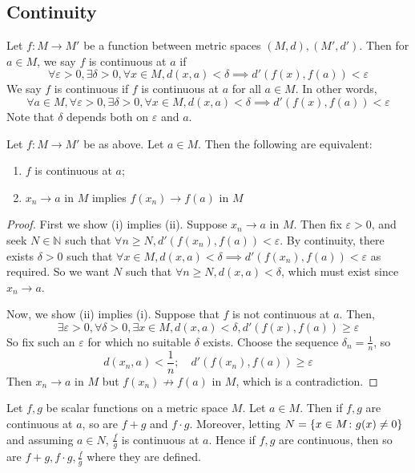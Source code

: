 \subsection{Continuity}
\begin{definition}
	Let \( f \colon M \to M' \) be a function between metric spaces \( (M, d), (M', d') \).
	Then for \( a \in M \), we say \( f \) is continuous at \( a \) if
	\[
		\forall \varepsilon > 0, \exists \delta > 0, \forall x \in M, d(x,a) < \delta \implies d'(f(x), f(a)) < \varepsilon
	\]
	We say \( f \) is continuous if \( f \) is continuous at \( a \) for all \( a \in M \).
	In other words,
	\[
		\forall a \in M, \forall \varepsilon > 0, \exists \delta > 0, \forall x \in M, d(x,a) < \delta \implies d'(f(x), f(a)) < \varepsilon
	\]
	Note that \( \delta \) depends both on \( \varepsilon \) and \( a \).
\end{definition}
\begin{proposition}
	Let \( f \colon M \to M' \) be as above.
	Let \( a \in M \).
	Then the following are equivalent:
	\begin{enumerate}
		\item \( f \) is continuous at \( a \);
		\item \( x_n \to a \) in \( M \) implies \( f(x_n) \to f(a) \) in \( M \)
	\end{enumerate}
\end{proposition}
\begin{proof}
	First we show (i) implies (ii).
	Suppose \( x_n \to a \) in \( M \).
	Then fix \( \varepsilon > 0 \), and seek \( N \in \mathbb N \) such that \( \forall n \geq N, d'(f(x_n), f(a)) < \varepsilon \).
	By continuity, there exists \( \delta > 0 \) such that \( \forall x \in M, d(x,a) < \delta \implies d'(f(x_n), f(a)) < \varepsilon \) as required.
	So we want \( N \) such that \( \forall n \geq N, d(x,a) < \delta \), which must exist since \( x_n \to a \).

	Now, we show (ii) implies (i).
	Suppose that \( f \) is not continuous at \( a \).
	Then,
	\[
		\exists \varepsilon > 0, \forall \delta > 0, \exists x \in M, d(x,a) < \delta, d'(f(x), f(a)) \geq \varepsilon
	\]
	So fix such an \( \varepsilon \) for which no suitable \( \delta \) exists.
	Choose the sequence \( \delta_n = \frac{1}{n} \), so
	\[
		d(x_n,a) < \frac{1}{n};\quad d'(f(x_n), f(a)) \geq \varepsilon
	\]
	Then \( x_n \to a \) in \( M \) but \( f(x_n) \not\to f(a) \) in \( M \), which is a contradiction.
\end{proof}
\begin{proposition}
	Let \( f,g \) be scalar functions on a metric space \( M \).
	Let \( a \in M \).
	Then if \( f,g \) are continuous at \( a \), so are \( f+g \) and \( f \cdot g \).
	Moreover, letting \( N = \qty{x \in M \colon g(x) \neq 0} \) and assuming \( a \in N \), \( \frac{f}{g} \) is continuous at \( a \).
	Hence if \( f,g \) are continuous, then so are \( f+g, f \cdot g, \frac{f}{g} \) where they are defined.
\end{proposition}
